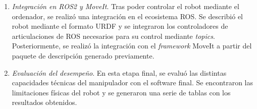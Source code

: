 \begin{enumerate}
\item \textit{Integración en ROS2 y MoveIt}. Tras poder controlar el robot mediante el ordenador, se realizó una integración en el 
ecosistema ROS. Se describió el robot mediante el formato URDF y se integraron los controladores de articulaciones de ROS necesarios 
para su control mediante \textit{topics}. Posteriormente, se realizó la integración con el \textit{framework} MoveIt a partir del paquete 
de descripción generado previamente. 

\item \textit{Evaluación del desempeño}. En esta etapa final, se evaluó las distintas capacidades técnicas del manipulador con el 
software final. Se encontraron las limitaciones físicas del robot y se generaron una serie de tablas con los resultados obtenidos.

\end{enumerate}


